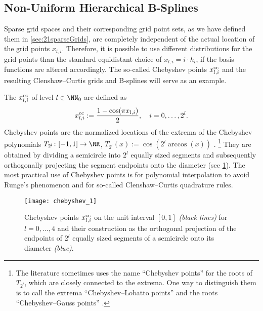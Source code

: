 \subsection{Non-Uniform Hierarchical B-Splines}

Sparse grid spaces and their corresponding grid point sets,
as we have defined them in \cref{sec:21sparseGrids},
are completely independent of the actual location of the grid points
$x_{l,i}$.
Therefore, it is possible to use different distributions for the grid points
than the standard equidistant choice of $x_{l,i} = i \cdot h_l$,
if the basis functions are altered accordingly.
The so-called Chebyshev points $x_{l,i}^{\mathrm{cc}}$ and the
resulting Clenshaw--Curtis grids and B-splines will serve as an example.

%
The  $x_{l,i}^{\mathrm{cc}}$ of level $l \in \NN_0$
are defined as
\begin{equation}
  x_{l,i}^{\mathrm{cc}}
  := \frac{1 - \cos(\pi x_{l,i})}{2},\quad
  i = 0, \dotsc, 2^l.
\end{equation}
Chebyshev points are the normalized locations of the extrema of the
Chebyshev polynomials $T_{2^l}\colon [-1, 1] \to \RR$,
$T_{2^l}(x) := \cos(2^l \arccos(x))$ \cite{Xu16Chebyshev}.%
\footnote{%
  The literature sometimes uses the name ``Chebyshev points'' for
  the roots of $T_{2^l}$, which are closely connected to the extrema.
  One way to distinguish them is to call the extrema
  ``Chebyshev--Lobatto points'' and the roots
  ``Chebyshev--Gauss points'' \cite{Xu16Chebyshev}.%
}
They are obtained by dividing a semicircle into $2^l$ equally sized
segments and subsequently orthogonally projecting the
segment endpoints onto the diameter
(see \cref{fig:chebyshev}).
The most practical use of Chebyshev points is for
polynomial interpolation to avoid Runge's phenomenon and for
so-called Clenshaw--Curtis quadrature rules.

\begin{figure}
  \texttt{[image: chebyshev\_1]}%
  \caption{%
    Chebyshev points $x_{l,i}^{\mathrm{cc}}$ on the unit interval $[0, 1]$
    \emph{(black lines)}
    for $l = 0, \dotsc, 4$
    and their construction as the orthogonal projection of the
    endpoints of $2^l$ equally sized segments
    of a semicircle onto its diameter \emph{\textcolor{C0}{(blue)}}.%
  }
  \label{fig:chebyshev}
\end{figure}

